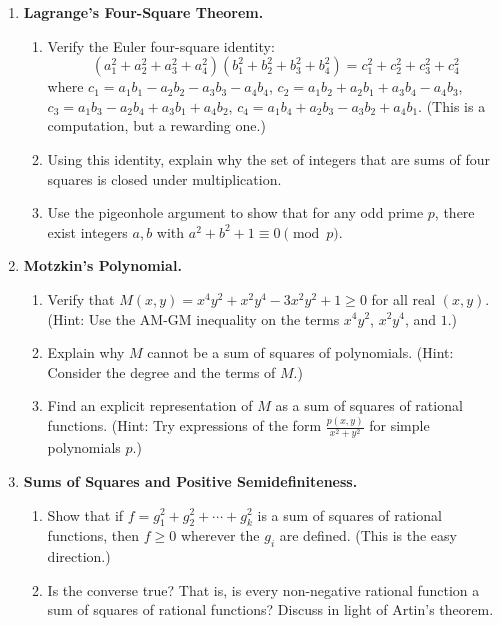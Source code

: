 \begin{enumerate}

    \item \textbf{Lagrange's Four-Square Theorem.}
    \begin{enumerate}
        \item Verify the Euler four-square identity:
        \[
            (a_1^2 + a_2^2 + a_3^2 + a_4^2)(b_1^2 + b_2^2 + b_3^2 + b_4^2) = c_1^2 + c_2^2 + c_3^2 + c_4^2
        \]
        where $c_1 = a_1 b_1 - a_2 b_2 - a_3 b_3 - a_4 b_4$, $c_2 = a_1 b_2 + a_2 b_1 + a_3 b_4 - a_4 b_3$, $c_3 = a_1 b_3 - a_2 b_4 + a_3 b_1 + a_4 b_2$, $c_4 = a_1 b_4 + a_2 b_3 - a_3 b_2 + a_4 b_1$. (This is a computation, but a rewarding one.)
        \item Using this identity, explain why the set of integers that are sums of four squares is closed under multiplication.
        \item Use the pigeonhole argument to show that for any odd prime $p$, there exist integers $a,b$ with $a^2 + b^2 + 1 \equiv 0 \pmod{p}$.
    \end{enumerate}

    \item \textbf{Motzkin's Polynomial.}
    \begin{enumerate}
        \item Verify that $M(x,y) = x^4 y^2 + x^2 y^4 - 3x^2 y^2 + 1 \geq 0$ for all real $(x,y)$. (Hint: Use the AM-GM inequality on the terms $x^4 y^2$, $x^2 y^4$, and $1$.)
        \item Explain why $M$ cannot be a sum of squares of polynomials. (Hint: Consider the degree and the terms of $M$.)
        \item Find an explicit representation of $M$ as a sum of squares of rational functions. (Hint: Try expressions of the form $\frac{p(x,y)}{x^2 + y^2}$ for simple polynomials $p$.)
    \end{enumerate}

    \item \textbf{Sums of Squares and Positive Semidefiniteness.}
    \begin{enumerate}
        \item Show that if $f = g_1^2 + g_2^2 + \cdots + g_k^2$ is a sum of squares of rational functions, then $f \geq 0$ wherever the $g_i$ are defined. (This is the easy direction.)
        \item Is the converse true? That is, is every non-negative rational function a sum of squares of rational functions? Discuss in light of Artin's theorem.
    \end{enumerate}


\end{enumerate}
